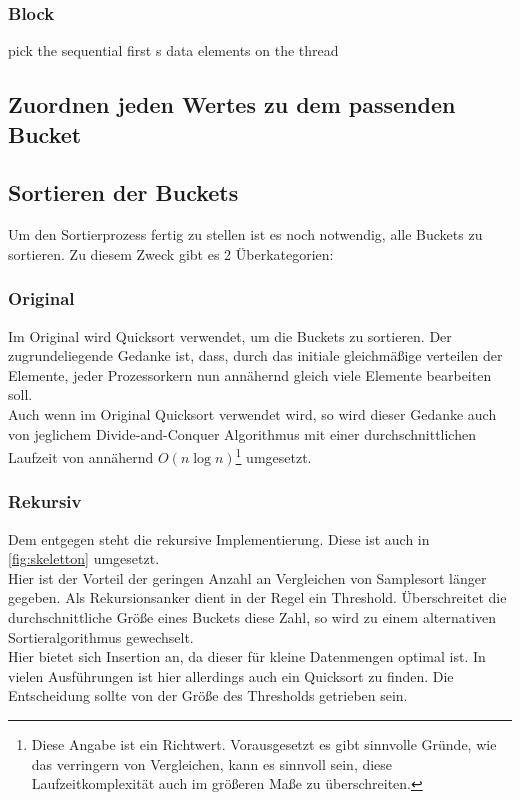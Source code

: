		\subsubsection{Block}
			\label{sec:block}
			pick the sequential first s data elements on the thread
			

	\subsection{Zuordnen jeden Wertes zu dem passenden Bucket}
		

	\subsection{Sortieren der Buckets}
		Um den Sortierprozess fertig zu stellen ist es noch notwendig, alle Buckets zu sortieren.
		Zu diesem Zweck gibt es 2 Überkategorien:
		\subsubsection{Original}
			Im Original \autocite{frazer-1970} wird Quicksort verwendet, um die Buckets zu sortieren.
			Der zugrundeliegende Gedanke ist, dass, durch das initiale gleichmäßige verteilen der Elemente, jeder Prozessorkern nun annähernd gleich viele Elemente bearbeiten soll.\\
			Auch wenn im Original Quicksort verwendet wird, so wird dieser Gedanke auch von jeglichem Divide-and-Conquer Algorithmus mit einer durchschnittlichen Laufzeit von annähernd $O(n\log{n})$\footnote{Diese Angabe ist ein Richtwert. Vorausgesetzt es gibt sinnvolle Gründe, wie das verringern von Vergleichen, kann es sinnvoll sein, diese Laufzeitkomplexität auch im größeren Maße zu überschreiten.} umgesetzt. 
		\subsubsection{Rekursiv}
			Dem entgegen steht die rekursive Implementierung.
			Diese ist auch in \ref{fig:skeletton} umgesetzt.\\
			Hier ist der Vorteil der geringen Anzahl an Vergleichen von Samplesort länger gegeben. Als Rekursionsanker dient in der Regel ein Threshold.
			Überschreitet die durchschnittliche Größe eines Buckets diese Zahl, so wird zu einem alternativen Sortieralgorithmus gewechselt. \\
			Hier bietet sich Insertion an, da dieser für kleine Datenmengen optimal ist. \autocite{geeksforgeeks-2021} 
			In vielen Ausführungen ist hier allerdings auch ein Quicksort zu finden.
			Die Entscheidung sollte von der Größe des Thresholds getrieben sein.
			
